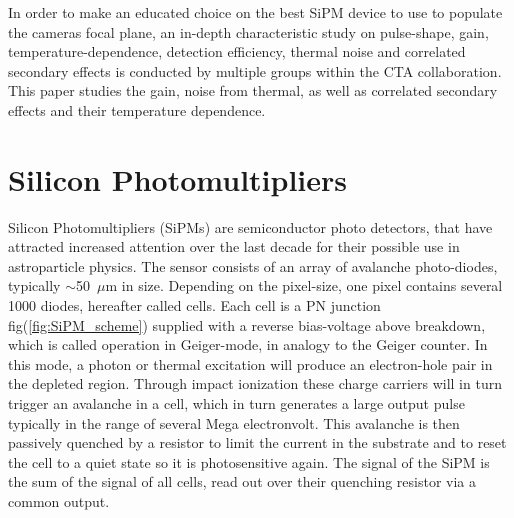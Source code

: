 \documentclass[12pt,article,type=msc,colorback,accentcolor=tud9c]{tudthesis}
\begin{document}
In order to make an educated choice on the best SiPM device to use to populate the cameras focal plane, an in-depth characteristic study on pulse-shape, gain, temperature-dependence, detection efficiency, thermal noise and correlated secondary effects is conducted by multiple groups within the CTA collaboration.\\

This paper studies the gain, noise from thermal, as well as correlated secondary effects and their temperature dependence. 





\clearpage
\section{\Large Silicon Photomultipliers}
\label{sec:SiPM}

\begin{figure}[h]
\begin{centering}
}
\caption[PMT and SiPM size]{The size of the photodetector still used in progenitor IACT experiments (PMT)(left) compared to an SiPM(right). Picture from \cite{RWTHMaster1}}
\label{fig:PMT_SiPM_Size}
\end{centering}
\end{figure}

Silicon Photomultipliers (SiPMs) are semiconductor photo detectors, that have attracted increased attention over the last decade for their possible use in astroparticle physics. The sensor consists of an array of avalanche photo-diodes, typically $\sim$50~$\mu$m in size. Depending on the pixel-size, one pixel contains several 1000 diodes, hereafter called cells. Each cell is a PN junction fig(\ref{fig:SiPM_scheme}) supplied with a reverse bias-voltage above breakdown, which is called operation in Geiger-mode, in analogy to the Geiger counter. In this mode, a photon or thermal excitation will produce an electron-hole pair in the depleted region. Through impact ionization these charge carriers will in turn trigger an avalanche in a cell, which in turn generates a large output pulse typically in the range of several Mega electronvolt. This avalanche is then passively quenched by a resistor to limit the current in the substrate and to reset the cell to a quiet state so it is photosensitive again. The signal of the SiPM is the sum of the signal of all cells, read out over their quenching resistor via a common output.\\
\end{document}
